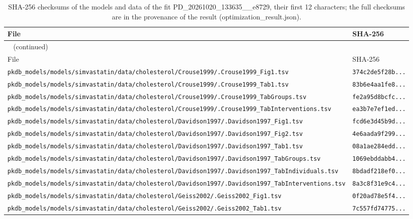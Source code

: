 \documentclass{article}
\begin{document}
\begin{longtable}{ll}
\caption{SHA-256 checksums of the models and data of the fit PD\_20261020\_133635\_\_e8729, their first 12 characters; the full checksums are in the provenance of the result (optimization\_result.json).}\label{tab:checksums:PD_20261020_133635__e8729} \\
\toprule
File & SHA-256 \\
\midrule
\endfirsthead
\multicolumn{2}{l}{\small\tablename~\thetable{} (continued)} \\
\toprule
File & SHA-256 \\
\midrule
\endhead
\bottomrule
\endlastfoot
\texttt{pkdb\_models/models/simvastatin/data/cholesterol/Crouse1999/.Crouse1999\_Fig1.tsv} & \texttt{374c2de5f28b...} \\
\texttt{pkdb\_models/models/simvastatin/data/cholesterol/Crouse1999/.Crouse1999\_Tab1.tsv} & \texttt{83b6e4aa1fe8...} \\
\texttt{pkdb\_models/models/simvastatin/data/cholesterol/Crouse1999/.Crouse1999\_TabGroups.tsv} & \texttt{fe2a95d8bcfc...} \\
\texttt{pkdb\_models/models/simvastatin/data/cholesterol/Crouse1999/.Crouse1999\_TabInterventions.tsv} & \texttt{ea3b7e7ef1ed...} \\
\texttt{pkdb\_models/models/simvastatin/data/cholesterol/Davidson1997/.Davidson1997\_Fig1.tsv} & \texttt{fcd6e3d45b9d...} \\
\texttt{pkdb\_models/models/simvastatin/data/cholesterol/Davidson1997/.Davidson1997\_Fig2.tsv} & \texttt{4e6aada9f299...} \\
\texttt{pkdb\_models/models/simvastatin/data/cholesterol/Davidson1997/.Davidson1997\_Tab1.tsv} & \texttt{08a1ae284edd...} \\
\texttt{pkdb\_models/models/simvastatin/data/cholesterol/Davidson1997/.Davidson1997\_TabGroups.tsv} & \texttt{1069ebddabb4...} \\
\texttt{pkdb\_models/models/simvastatin/data/cholesterol/Davidson1997/.Davidson1997\_TabIndividuals.tsv} & \texttt{8bdadf218ef0...} \\
\texttt{pkdb\_models/models/simvastatin/data/cholesterol/Davidson1997/.Davidson1997\_TabInterventions.tsv} & \texttt{8a3c8f31e9c4...} \\
\texttt{pkdb\_models/models/simvastatin/data/cholesterol/Geiss2002/.Geiss2002\_Fig1.tsv} & \texttt{0f20ad78e5f4...} \\
\texttt{pkdb\_models/models/simvastatin/data/cholesterol/Geiss2002/.Geiss2002\_Tab1.tsv} & \texttt{7c557fd74775...} \\

\end{longtable}
\end{document}
